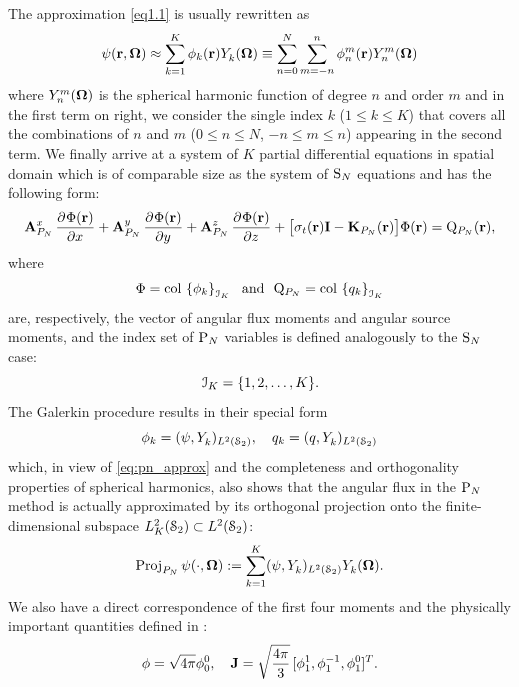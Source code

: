 The approximation \eqref{eq1.1} is usually rewritten as
\begin{equation}\label{eq:pn_approx}
	\psi(\br,\bomega) \approx \sum_{k=1}^{ K} \phi_k(\br)\Y{k}{}(\bomega) \equiv
	\suma[n]{0}{N}\suma[m]{-n}{n}\angmom{n}{m}(\br)\Y{n}{m}(\bomega)
\end{equation}
where $\Y{n}{m}(\bomega)$ is the spherical harmonic function of degree $n$ and order $m$
and in the first term on right, we consider the single index $k$ ($1 \leq k \leq  K$) that covers all the combinations of $n$ and $m$ ($0 \leq n \leq N$, $-n\leq m \leq n$) appearing in the second term. We finally arrive at a system of $ K$
partial differential equations in spatial domain which is of comparable size as the system of $\SN$ equations and has the following form:
\begin{equation}\label{eq:pn1}
	\mat{A}^x_{P_N}\,\pd{\Phi(\br)}{x} + \mat{A}^y_{P_N}\,\pd{\Phi(\br)}{y} + \mat{A}^z_{P_N}\,\pd{\Phi(\br)}{z} +
	\bigl[\sigma_t(\br)\mat{I} - \mat{K}_{P_N}(\br)\bigr]\Phi(\br) = \mathrm{Q}_{P_N}(\br),
\end{equation}
where 
\begin{equation}\label{eq:pn_vectors}
	\Phi = \col\left\{\phi_k\right\}_{\idxset{K}} \ \text{ and }\ 
	\mathrm{Q}_{P_N} = \col\left\{q_k\right\}_{\idxset{K}}
\end{equation}
are, respectively, the vector of angular flux
moments and angular source moments, and the index set of $\PN$ variables is defined analogously to the $\SN$ case:
$$
\idxset{K} = \{1,2,\ldots,K\}.
$$
The
Galerkin procedure results in their special form
\begin{equation}\label{eq:pn_angmom}
	\phi_k = (\psi, \Y{k}{})_{\Lp[2](\Sphere)},\quad q_k = (q, \Y{k}{})_{\Lp[2](\Sphere)}
\end{equation}
which, in view of \eqref{eq:pn_approx} and the completeness and orthogonality properties of spherical harmonics, also 
shows that the angular flux in the $\PN$ method is actually approximated by its orthogonal projection onto the
finite-dimensional subspace $\Lp[2]_K(\Sphere)\subset\Lp[2](\Sphere)$:
\begin{equation}\label{eq:PN_proj}
	\Projop\psi(\cdot,\bomega) := \sum_{k=1}^{ K}\ips{\psi}{\Y{k}{}} \Y{k}{}(\bomega).
\end{equation}
We also have a direct correspondence of the first four moments and the physically important quantities defined in
\sref{sec:qoi}:
$$
	\phi = \sqrt{4\pi}\angmom{0}{0},\quad \bJ = \sqrt{\frac{4\pi }{3}}\, [\angmom{1}{1}, \angmom{1}{-1}, \angmom{1}{0}]^T.
$$

